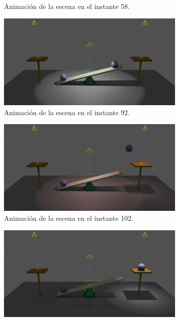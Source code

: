\documentclass{article}
\begin{document}
\begin{figure}[H]
\begin{subfigure}[t]{0.48\textwidth}
    \caption{Animación de la escena en el instante 58.}
 \end{subfigure}
\hfill
 \begin{subfigure}[t]{0.48\textwidth}
    \centering
    \includegraphics[width=\textwidth]{imagenes/animaciones/general/92.png}
    \caption{Animación de la escena en el instante 92.}
 \end{subfigure}
\hfill
 \begin{subfigure}[t]{0.48\textwidth}
    \centering
    \includegraphics[width=\textwidth]{imagenes/animaciones/general/102.png}
    \caption{Animación de la escena en el instante 102.}
 \end{subfigure}
\hfill
 \begin{subfigure}[t]{0.48\textwidth}
    \centering
    \includegraphics[width=\textwidth]{imagenes/animaciones/general/112.png}

\end{subfigure}
\end{figure}
\end{document}

